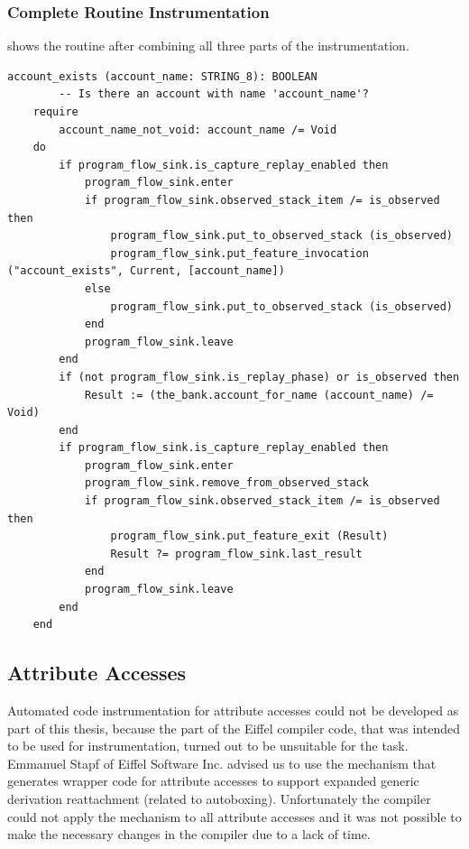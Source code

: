 \subsubsection{Complete Routine Instrumentation}
 shows the routine after combining all three parts of the instrumentation.
\begin{lstlisting}[caption=Routine \feature{account\_exists} After Instrumentation,label=lst:account_exists_instrumented]
account_exists (account_name: STRING_8): BOOLEAN
		-- Is there an account with name 'account_name'?
	require
		account_name_not_void: account_name /= Void
	do
		if program_flow_sink.is_capture_replay_enabled then
			program_flow_sink.enter
			if program_flow_sink.observed_stack_item /= is_observed then
				program_flow_sink.put_to_observed_stack (is_observed)
				program_flow_sink.put_feature_invocation ("account_exists", Current, [account_name])
			else
				program_flow_sink.put_to_observed_stack (is_observed)
			end
			program_flow_sink.leave
		end
		if (not program_flow_sink.is_replay_phase) or is_observed then
			Result := (the_bank.account_for_name (account_name) /= Void)
		end
		if program_flow_sink.is_capture_replay_enabled then
			program_flow_sink.enter
			program_flow_sink.remove_from_observed_stack
			if program_flow_sink.observed_stack_item /= is_observed then
				program_flow_sink.put_feature_exit (Result)
				Result ?= program_flow_sink.last_result
			end
			program_flow_sink.leave
		end
	end
\end{lstlisting}


\subsection{Attribute Accesses}
Automated code instrumentation for attribute accesses could not be developed as part of this thesis, because the part of the Eiffel compiler code, that was intended to be used for instrumentation, turned out to be unsuitable for the task. Emmanuel Stapf of Eiffel Software Inc. advised us to use the mechanism that generates wrapper code for attribute accesses to support expanded generic derivation reattachment (related to autoboxing). Unfortunately the compiler could not apply the mechanism to all attribute accesses and it was not possible to make the necessary changes in the compiler due to a lack of time.

